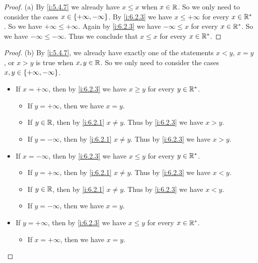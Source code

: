 \begin{proof}{(a)}
  By \cref{i:5.4.7} we already have \(x \leq x\) when \(x \in \mathbb{R}\).
  So we only need to consider the cases \(x \in \left\lbrace+\infty, -\infty\right\rbrace\).
  By \cref{i:6.2.3} we have \(x \leq +\infty\) for every \(x \in \mathbb{R}^*\).
  So we have \(+\infty \leq +\infty\).
  Again by \cref{i:6.2.3} we have \(-\infty \leq x\) for every \(x \in \mathbb{R}^*\).
  So we have \(-\infty \leq -\infty\).
  Thus we conclude that \(x \leq x\) for every \(x \in \mathbb{R}^*\).
\end{proof}

\begin{proof}{(b)}
  By \cref{i:5.4.7}, we already have exactly one of the statements \(x < y\), \(x = y\), or \(x > y\) is true when \(x, y \in \mathbb{R}\).
  So we only need to consider the cases \(x, y \in \left\lbrace+\infty, -\infty\right\rbrace\).
  \begin{itemize}
    \item If \(x = +\infty\), then by \cref{i:6.2.3} we have \(x \geq y\) for every \(y \in \mathbb{R}^*\).
          \begin{itemize}
            \item If \(y = +\infty\), then we have \(x = y\).
            \item If \(y \in \mathbb{R}\), then by \cref{i:6.2.1} \(x \neq y\).
                  Thus by \cref{i:6.2.3} we have \(x > y\).
            \item If \(y = -\infty\), then by \cref{i:6.2.1} \(x \neq y\).
                  Thus by \cref{i:6.2.3} we have \(x > y\).
          \end{itemize}
    \item If \(x = -\infty\), then by \cref{i:6.2.3} we have \(x \leq y\) for every \(y \in \mathbb{R}^*\).
          \begin{itemize}
            \item If \(y = +\infty\), then by \cref{i:6.2.1} \(x \neq y\).
                  Thus by \cref{i:6.2.3} we have \(x < y\).
            \item If \(y \in \mathbb{R}\), then by \cref{i:6.2.1} \(x \neq y\).
                  Thus by \cref{i:6.2.3} we have \(x < y\).
            \item If \(y = -\infty\), then we have \(x = y\).
          \end{itemize}
    \item If \(y = +\infty\), then by \cref{i:6.2.3} we have \(x \leq y\) for every \(x \in \mathbb{R}^*\).
          \begin{itemize}
            \item If \(x = +\infty\), then we have \(x = y\).

\end{itemize}
\end{itemize}
\end{proof}
